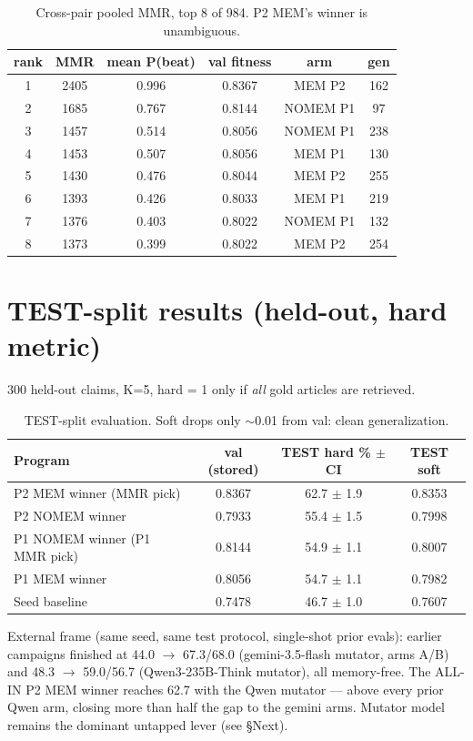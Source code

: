 \documentclass[10pt]{article}
\begin{document}
\begin{table}[H]\centering
\begin{tabular}{cccccc}
\toprule
rank & MMR & mean P(beat) & val fitness & arm & gen \\
\midrule
1 & 2405 & 0.996 & 0.8367 & MEM P2 & 162 \\
2 & 1685 & 0.767 & 0.8144 & NOMEM P1 & 97 \\
3 & 1457 & 0.514 & 0.8056 & NOMEM P1 & 238 \\
4 & 1453 & 0.507 & 0.8056 & MEM P1 & 130 \\
5 & 1430 & 0.476 & 0.8044 & MEM P2 & 255 \\
6 & 1393 & 0.426 & 0.8033 & MEM P1 & 219 \\
7 & 1376 & 0.403 & 0.8022 & NOMEM P1 & 132 \\
8 & 1373 & 0.399 & 0.8022 & MEM P2 & 254 \\
\bottomrule
\end{tabular}
\caption{Cross-pair pooled MMR, top 8 of 984. P2 MEM's winner is unambiguous.}
\end{table}

\section*{TEST-split results (held-out, hard metric)}
300 held-out claims, K=5, hard = 1 only if \emph{all} gold articles are retrieved.

\begin{table}[H]\centering
\begin{tabular}{lccc}
\toprule
Program & val (stored) & TEST hard \% $\pm$ CI & TEST soft \\
\midrule
P2 MEM winner (MMR pick) & 0.8367 & 62.7 $\pm$ 1.9 & 0.8353 \\
P2 NOMEM winner & 0.7933 & 55.4 $\pm$ 1.5 & 0.7998 \\
P1 NOMEM winner (P1 MMR pick) & 0.8144 & 54.9 $\pm$ 1.1 & 0.8007 \\
P1 MEM winner & 0.8056 & 54.7 $\pm$ 1.1 & 0.7982 \\
Seed baseline & 0.7478 & 46.7 $\pm$ 1.0 & 0.7607 \\
\bottomrule
\end{tabular}
\caption{TEST-split evaluation. Soft drops only $\sim$0.01 from val: clean generalization.}
\end{table}

External frame (same seed, same test protocol, single-shot prior evals): earlier
campaigns finished at 44.0 $\to$ 67.3/68.0 (gemini-3.5-flash mutator, arms A/B) and
48.3 $\to$ 59.0/56.7 (Qwen3-235B-Think mutator), all memory-free. The ALL-IN P2 MEM
winner reaches 62.7 with the Qwen mutator --- above every prior Qwen arm, closing
more than half the gap to the gemini arms. Mutator model remains the dominant
untapped lever (see \S Next).
\end{document}
